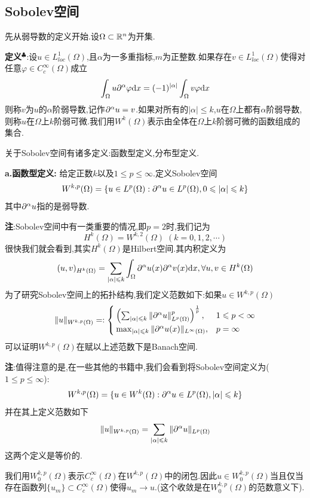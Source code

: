 \newpage
\subsection{Sobolev空间}
先从弱导数的定义开始.设$\Omega\subset\mathbb{R} ^n$为开集.\par
\textbf{定义}$^\clubsuit $:设$u\in L^1_{loc}(\Omega)$,且$\alpha$为一多重指标,$m$为正整数.如果存在$v\in L^1_{loc}(\Omega)$使得对任意$\varphi\in C^{\infty}_{c}(\Omega)$成立
$$
\int_{\Omega}u\partial ^{\alpha}\varphi\mathrm{d} x=(-1)^{|\alpha|}\int_{\Omega}v\varphi\mathrm{d} x
$$
则称$v$为$u$的$\alpha$阶弱导数,记作$\partial ^{\alpha}u=v$.如果对所有的$|\alpha|\leqslant k$,$u$在$\Omega$上都有$\alpha$阶弱导数,则称$u$在$\Omega$上$k$阶弱可微.我们用$W^{k}(\Omega)$表示由全体在$\Omega$上$k$阶弱可微的函数组成的集合.\par
关于Sobolev空间有诸多定义:函数型定义,分布型定义.\par
\textbf{a.函数型定义: }给定正数$k$以及$1\leqslant p\leqslant\infty$.定义Sobolev空间
$$
W^{k,p}(\Omega)=\{u\in L^{p}(\Omega):\partial^{\alpha}u\in L^{p}(\Omega),0\leqslant |\alpha|\leqslant k\}
$$
其中$\partial^{\alpha}u$指的是弱导数.\par
\textbf{注}:Sobolev空间中有一类重要的情况,即$p=2$时,我们记为
$$
H^k(\Omega)=W^{k,2}(\Omega)\; (k=0,1,2,\cdots)
$$
很快我们就会看到,其实$H^k(\Omega)$是Hilbert空间.其内积定义为
$$
(u,v)_{H^k(\Omega)}=\sum_{|\alpha|\leqslant k}\int_{\Omega}\partial ^{\alpha}u(x)\partial ^{\alpha}v(x)\mathrm{d} x,\forall u,v\in H^k(\Omega)
$$
为了研究Sobolev空间上的拓扑结构,我们定义范数如下:如果$u\in W^{k,p}(\Omega)$
$$
\|u\|_{W^{k,p}(\Omega)}=:
\begin{cases}
    \left(\sum_{|\alpha|\leqslant k}\|\partial^{\alpha}u\|_{L^p(\Omega)}^p\right)^{\frac{1}{p}},& 1\leqslant p<\infty\\
    \max_{|\alpha|\leqslant k}\|\partial^{\alpha}u(x)\|_{L^\infty(\Omega)},& p=\infty
\end{cases}
$$
可以证明$W^{k,p}(\Omega)$在赋以上述范数下是Banach空间.\par
\textbf{注}:值得注意的是,在一些其他的书籍中,我们会看到将Sobolev空间定义为($1\leqslant p\leqslant\infty$):
$$
W^{k,p}(\Omega)=\{u\in W^{k}(\Omega):\partial^{\alpha}u\in L^{p}(\Omega),|\alpha|\leqslant k\}
$$
并在其上定义范数如下
$$
\|u\|_{W^{k,p}(\Omega)}=\sum_{|\alpha|\leqslant k}\|\partial ^{\alpha}u\|_{L^{p}(\Omega)}
$$
这两个定义是等价的.\par
我们用$W^{k,p}_0(\Omega)$表示$C^{\infty}_{c}(\Omega)$在$W^{k,p}(\Omega)$中的闭包.因此$u\in W^{k,p}_0(\Omega)$当且仅当存在函数列$\{u_m\}\subset C^{\infty}_{c}(\Omega)$使得$u_m\to u$.(这个收敛是在$W^{k,p}_0(\Omega)$的范数意义下).
